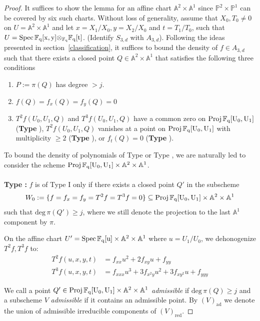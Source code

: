 \documentclass[12pt]{article}
\theoremstyle{plain}
\theoremstyle{definition}
\newcommand{\IA}{\mathbb{A}}
\newcommand{\IF}{\mathbb{F}}
\newcommand{\IP}{\mathbb{P}}
\renewcommand{\deg}{\mathrm{deg}\,}
\newcommand{\Spec}{\rm Spec\,}
\newcommand{\Proj}{\rm Proj\,}
\newcommand\tensor{{\otimes}}
\newcommand{\<}{\langle}
\renewcommand{\>}{\rangle}
\newcommand{\ad}{\mathrm{ad}}
\begin{document}
\begin{proof}
It suffices to show the lemma for an affine chart $\IA^2 \times \IA^1$ since $\IP^2 \times \IP^1$ can be covered by six such charts. Without loss of generality, assume that $X_0, T_0 \neq 0$ on $U = \IA^2 \times \IA^1$ and let $x = X_1/X_0, y = X_2/X_0$ and $t = T_1/T_0$, such that $U = \Spec \IF_q[x, y] \tensor_{\IF_q} \IF_q[t]$. (Identify $S_{3, d}$ with $A_{3, d}$). Following the ideas presented in section~\ref{classification}, it suffices to bound the density of $f \in A_{3, d}$ such that there exists a closed point $Q \in \IA^2 \times \IA^1$ that satisfies the following three conditions
\begin{enumerate}
\item $P := \pi(Q)$ has degree $> j$. 
\item $f(Q) = f_x(Q) = f_y(Q) = 0$
\item $T^2 f(U_0, U_1, Q)$ and $T^3 f(U_0, U_1, Q)$ have a common zero on $\Proj \IF_q[U_0, U_1]$ (\textbf{Type \uppercase\expandafter{}}), $T^2 f(U_0, U_1, Q)$ vanishes at a point on $\Proj \IF_q[U_0, U_1]$ with multiplicity $\ge 2$ (\textbf{Type \uppercase\expandafter{}}), or $f_t(Q) = 0$ (\textbf{Type \uppercase\expandafter{}}).
\end{enumerate}

To bound the density of polynomials of Type \uppercase\expandafter{} or Type \uppercase\expandafter{}, we are naturally led to consider the scheme $\Proj \IF_q[U_0, U_1] \times \IA^2 \times \IA^1$. \\\\
\textbf{Type \uppercase\expandafter{}: } $f$ is of Type I only if there exists a closed point $Q'$ in the subscheme
$$ W_0 := \{f = f_x = f_y = T^2 f = T^3 f = 0\} \subseteq \Proj \IF_q[U_0, U_1] \times \IA^2 \times \IA^1 $$
such that $\deg \pi(Q') \ge j$, where we still denote the projection to the last $\IA^1$ component by $\pi$. 

On the affine chart $U' = \Spec \IF_q[u] \times \IA^2 \times \IA^1$ where $u = U_1/U_0$, we dehonogenize $T^2 f, T^3 f$ to:
\begin{align*}
T^2 f(u, x, y, t) &= f_{xx} u^2 + 2 f_{xy} u + f_{yy} \\
T^3 f(u, x, y, t) &= f_{xxx} u^3 + 3 f_{x^2 y} u^2 + 3 f_{xy^2}u + f_{yyy} 
\end{align*}

We call a point $Q' \in \Proj \IF_q[U_0, U_1] \times \IA^2 \times \IA^1$ \textit{admissible} if $\deg \pi(Q) \ge j$ and a subscheme $V$ \textit{admissible} if it contains an admissible point. By $(V)_\ad$ we denote the union of admissible irreducible components of $(V)_{\mathrm{red}}$. 



\end{proof}
\end{document}
